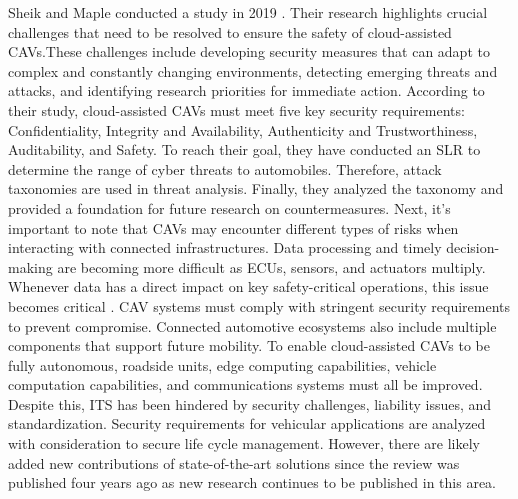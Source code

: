 \documentclass[a4paper,12pt]{article}
\begin{document}
Sheik and Maple conducted a study in 2019 \cite{article6}. Their research highlights crucial challenges that need to be resolved to ensure the safety of cloud-assisted CAVs.These challenges include developing security measures that can adapt to complex and constantly changing environments, detecting emerging threats and attacks, and identifying research priorities for immediate action. According to their study, cloud-assisted CAVs must meet five key security requirements: Confidentiality, Integrity and Availability, Authenticity and Trustworthiness, Auditability, and Safety. To reach their goal, they have conducted an SLR to determine the range of cyber threats to automobiles. Therefore, attack taxonomies are used in threat analysis. Finally, they analyzed the taxonomy and provided a foundation for future research on countermeasures. Next, it's important to note that CAVs may encounter different types of risks when interacting with connected infrastructures. Data processing and timely decision-making are becoming more difficult as ECUs, sensors, and actuators multiply. Whenever data has a direct impact on key safety-critical operations, this issue becomes critical \cite{article6}. CAV systems must comply with stringent security requirements to prevent compromise. Connected automotive ecosystems also include multiple components that support future mobility. To enable cloud-assisted CAVs to be fully autonomous, roadside units, edge computing capabilities, vehicle computation capabilities, and communications systems must all be improved. Despite this, ITS has been hindered by security challenges, liability issues, and standardization. Security requirements for vehicular applications are analyzed with consideration to secure life cycle management. However, there are likely added new contributions of state-of-the-art solutions since the review was published four years ago as new research continues to be published in this area.\par
\end{document}
